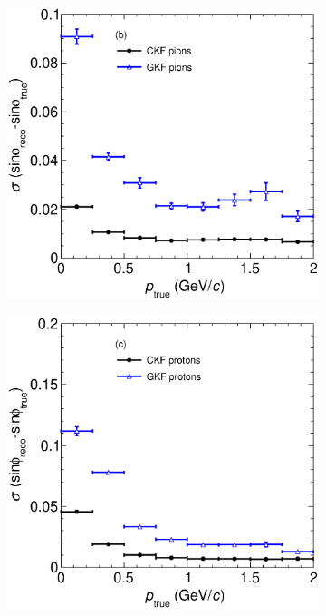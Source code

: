 \begin{figure}[t]
\begin{subfigure}{0.32\textwidth}
         \includegraphics[width=\textwidth]{figures/ch5-KF_NDGAr/FullSample/Int/Angle_Res/sinphi/RessinphiVSp_211.eps}
         \caption{}
         \label{fig:sinphiResVSp211_Int}
     \end{subfigure}
    \begin{subfigure}{0.32\textwidth}
         \centering
         \includegraphics[width=\textwidth]{figures/ch5-KF_NDGAr/FullSample/Int/Angle_Res/sinphi/RessinphiVSp_2212.eps}

\end{subfigure}
\end{figure}
